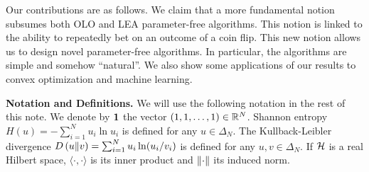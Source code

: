 Our contributions are as follows. We claim that a more fundamental notion
subsumes both \ac{OLO} and \ac{LEA} parameter-free algorithms. This notion is
linked to the ability to repeatedly bet on an outcome of a coin
flip. This new notion allows us to design novel parameter-free algorithms. In particular, the algorithms are simple and somehow ``natural''. We also show some applications of our results to convex optimization and machine learning.

\noindent\textbf{Notation and Definitions.} We will use the following notation
in the rest of this note. We denote by $\mathbf{1}$ the vector $(1,1,\dots,1)
\in \mathbb{R}^N$. Shannon entropy $H(u) = -\sum_{i=1}^N u_i \ln u_i$ is defined for
any $u \in \Delta_N$.  The Kullback-Leibler divergence $D\left({u}\middle\|{v}\right) =
\sum_{i=1}^N u_i \ln(u_i/v_i)$ is defined for any $u,v \in \Delta_N$. If $\mathcal{H}$
is a real Hilbert space, $\langle \cdot, \cdot \rangle$ is its inner
product and $\left\|{\cdot}\right\|$ its induced norm.
